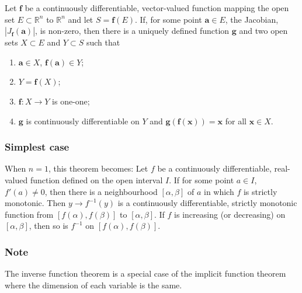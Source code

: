 \documentclass[12pt]{article}
\begin{document}
Let $\mathbf{f}$ be a continuously differentiable, vector-valued function mapping the open set $E \subset \mathbb{R}^{n}$ to $\mathbb{R}^{n}$ and let $S = \mathbf{f}(E)$.  If, for some point $\mathbf{a} \in E$, the Jacobian, $| J_{\mathbf{f}}(\mathbf{a}) |$, is non-zero, then there is a uniquely defined function $\mathbf{g}$ and two open sets $X \subset E$ and $Y \subset S$ such that
\begin{enumerate}
\item $\mathbf{a} \in X$, $\mathbf{f}(\mathbf{a}) \in Y$;
\item $Y = \mathbf{f}(X)$;
\item $\mathbf{f}:X \to Y$ is one-one;
\item $\mathbf{g}$ is continuously differentiable on $Y$ and $\mathbf{g}(\mathbf{f}(\mathbf{x})) = \mathbf{x}$ for all $\mathbf{x} \in X$.
\end{enumerate}

\subsubsection{Simplest case} When $n = 1$, this theorem becomes:  Let $f$ be a continuously differentiable, real-valued function defined on the open interval $I$.  If for some point $a \in I$, $f'(a) \neq 0$, then there is a neighbourhood $[\alpha, \beta]$ of $a$ in which $f$ is strictly monotonic.  Then $y \to f^{-1}(y)$ is a continuously differentiable, strictly monotonic function from $[f(\alpha), f(\beta)]$ to $[\alpha, \beta]$.  If $f$ is increasing (or decreasing) on $[\alpha, \beta]$, then so is $f^{-1}$ on $[f(\alpha), f(\beta)]$.

\subsubsection{Note} The inverse function theorem is a special case of the implicit function theorem where the dimension of each variable is the same.
\end{document}
